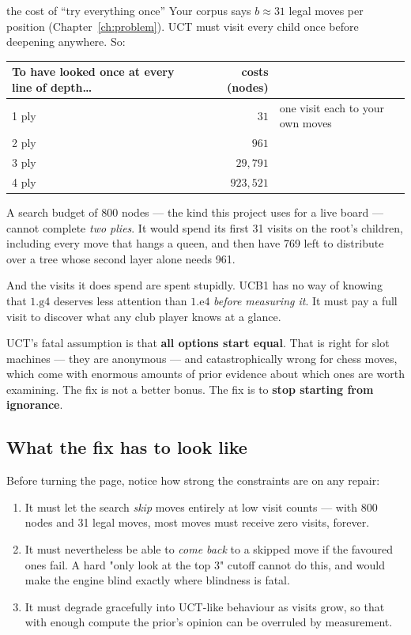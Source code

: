 \begin{worked}{the cost of ``try everything once''}
Your corpus says $b \approx 31$ legal moves per position (Chapter~\ref{ch:problem}). UCT must
visit every child once before deepening anywhere. So:

\begin{center}
\begin{tabular}{@{}lrl@{}}
\toprule
To have looked once at every line of depth\dots & costs (nodes) & \\
\midrule
1 ply  & $31$      & one visit each to your own moves \\
2 ply  & $961$     & \\
3 ply  & $29{,}791$ & \\
4 ply  & $923{,}521$ & \\
\bottomrule
\end{tabular}
\end{center}

A search budget of 800 nodes --- the kind this project uses for a live board --- cannot
complete \emph{two plies}. It would spend its first 31 visits on the root's children,
including every move that hangs a queen, and then have 769 left to distribute over a tree
whose second layer alone needs 961.
\end{worked}

And the visits it does spend are spent stupidly. UCB1 has no way of knowing that
$1.\text{g4}$ deserves less attention than $1.\text{e4}$ \emph{before measuring it}. It must
pay a full visit to discover what any club player knows at a glance.

\begin{keyidea}
UCT's fatal assumption is that \textbf{all options start equal}. That is right for slot
machines --- they are anonymous --- and catastrophically wrong for chess moves, which come
with enormous amounts of prior evidence about which ones are worth examining. The fix is not
a better bonus. The fix is to \textbf{stop starting from ignorance}.
\end{keyidea}

\subsection{What the fix has to look like}

Before turning the page, notice how strong the constraints are on any repair:

\begin{enumerate}
\item It must let the search \emph{skip} moves entirely at low visit counts --- with 800
  nodes and 31 legal moves, most moves must receive zero visits, forever.
\item It must nevertheless be able to \emph{come back} to a skipped move if the favoured ones
  fail. A hard "only look at the top 3" cutoff cannot do this, and would make the engine
  blind exactly where blindness is fatal.
\item It must degrade gracefully into UCT-like behaviour as visits grow, so that with enough
  compute the prior's opinion can be overruled by measurement.
\end{enumerate}

